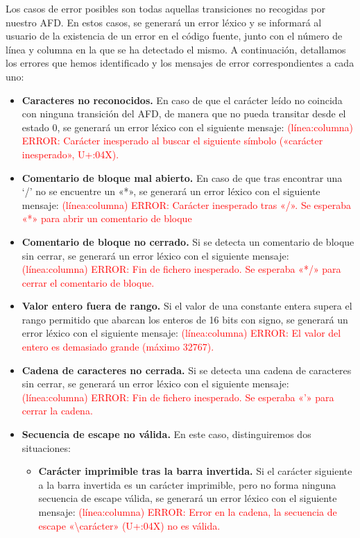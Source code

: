 Los casos de error posibles son todas aquellas transiciones no recogidas por nuestro AFD. En estos casos, se generará un error léxico y se informará al usuario de la existencia de un error en el código fuente, junto con el número de línea y columna en la que se ha detectado el mismo. A continuación, detallamos los errores que hemos identificado y los mensajes de error correspondientes a cada uno:\\
\begin{itemize}[left=1cm]
	\item \textbf{Caracteres no reconocidos.} En caso de que el carácter leído no coincida con ninguna transición del AFD, de manera que no pueda transitar desde el estado 0, se generará un error léxico con el siguiente mensaje: \textcolor{red}{(línea:columna) ERROR: Carácter inesperado al buscar el siguiente símbolo («carácter inesperado», U+{:04X}).}
    \item \textbf{Comentario de bloque mal abierto.} En caso de que tras encontrar una `/' no se encuentre un «*», se generará un error léxico con el siguiente mensaje: \textcolor{red}{(línea:columna) ERROR: Carácter inesperado tras «/». Se esperaba «*» para abrir un comentario de bloque}
    \item \textbf{Comentario de bloque no cerrado.} Si se detecta un comentario de bloque sin cerrar, se generará un error léxico con el siguiente mensaje: \textcolor{red}{(línea:columna) ERROR: Fin de fichero inesperado. Se esperaba «*/» para cerrar el comentario de bloque.}
	\item \textbf{Valor entero fuera de rango.} Si el valor de una constante entera supera el rango permitido que abarcan los enteros de 16 bits con signo, se generará un error léxico con el siguiente mensaje: \textcolor{red}{(línea:columna) ERROR: El valor del entero es demasiado grande (máximo 32767).}
    \item \textbf{Cadena de caracteres no cerrada.} Si se detecta una cadena de caracteres sin cerrar, se generará un error léxico con el siguiente mensaje: \textcolor{red}{(línea:columna) ERROR: Fin de fichero inesperado. Se esperaba «'» para cerrar la cadena.}
    \item \textbf{Secuencia de escape no válida.} En este caso, distinguiremos dos situaciones:
    \begin{itemize}
        \item \textbf{Carácter imprimible tras la barra invertida.} Si el carácter siguiente a la barra invertida es un carácter imprimible, pero no forma ninguna secuencia de escape válida, se generará un error léxico con el siguiente mensaje: \textcolor{red}{(línea:columna) ERROR: Error en la cadena, la secuencia de escape «\textbackslash carácter» (U+{:04X}) no es válida.}

\end{itemize}
\end{itemize}
